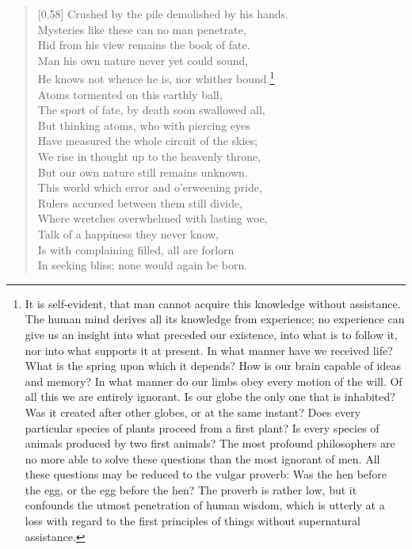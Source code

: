 \begin{verse}[0.58\textwidth]
Crushed by the pile demolished by his hands.\\
Mysteries like these can no man penetrate,\\
Hid from his view remains the book of fate.\\
Man his own nature never yet could sound,\\
He knows not whence he is, nor whither bound.\footnote{It is
self-evident, that man cannot acquire this knowledge without
assistance. The human mind derives all its knowledge from experience;
no experience can give us an insight into what preceded our existence,
into what is to follow it, nor into what supports it at present. In
what manner have we received life? What is the spring upon which it
depends? How is our brain capable of ideas and memory? In what manner
do our limbs obey every motion of the will. Of all this we are
entirely ignorant. Is our globe the only one that is inhabited? Was it
created after other globes, or at the same instant? Does every
particular species of plants proceed from a first plant? Is every
species of animals produced by two first animals? The most profound
philosophers are no more able to solve these questions than the most
ignorant of men. All these questions may be reduced to the vulgar
proverb: Was the hen before the egg, or the egg before the hen? The
proverb is rather low, but it confounds the utmost penetration of
human wisdom, which is utterly at a loss with regard to the first
principles of things without supernatural assistance.}\\
Atoms tormented on this earthly ball,\\
The sport of fate, by death soon swallowed all,\\
But thinking atoms, who with piercing eyes\\
Have measured the whole circuit of the skies;\\
We rise in thought up to the heavenly throne,\\
But our own nature still remains unknown.\\
This world which error and o'erweening pride,\\
Rulers accursed between them still divide,\\
Where wretches overwhelmed with lasting woe,\\
Talk of a happiness they never know,\\
Is with complaining filled, all are forlorn\\
In seeking bliss; none would again be born.\\

\end{verse}
